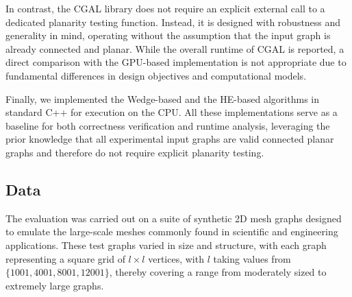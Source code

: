 In contrast, the CGAL library does not require an explicit external call to a dedicated planarity testing function. Instead, it is designed with robustness and generality in mind, operating without the assumption that the input graph is already connected and planar. While the overall runtime of CGAL is reported, a direct comparison with the GPU-based implementation is not appropriate due to fundamental differences in design objectives and computational models.

Finally, we implemented the Wedge-based and the HE-based algorithms in standard C++ for execution on the CPU. All these implementations serve as a baseline for both correctness verification and runtime analysis, leveraging the prior knowledge that all experimental input graphs are valid connected planar graphs and therefore do not require explicit planarity testing.




\subsection{Data}
The evaluation was carried out on a suite of synthetic 2D mesh graphs designed to emulate the large-scale meshes commonly found in scientific and engineering applications. These test graphs varied in size and structure, with each graph representing a square grid of \(l \times l\) vertices, with \(l\) taking values from \(\{1001, 4001, 8001, 12001\}\), thereby covering a range from moderately sized to extremely large graphs.

